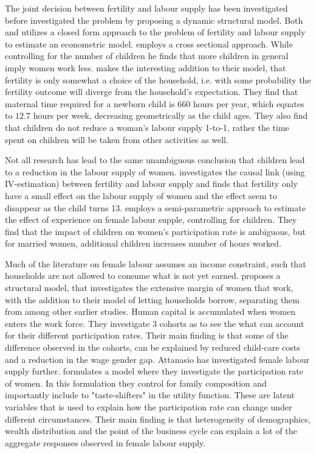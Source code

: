 The joint decision between fertility and labour supply has been investigated before \textcite{francesconi_joint_2002} investigated the problem by proposing a dynamic structural model. Both \textcite{moffitt_estimation_1984} and \textcite{hotz_empirical_1988} utilizes a closed form approach to the problem of fertility and labour supply to estimate an econometric model. \textcite{moffitt_estimation_1984} employs a cross sectional approach. While controlling for the  number of children he finds that more children in general imply women work less. \textcite{hotz_empirical_1988} makes the interesting addition to their model, that fertility is only somewhat a choice of the household, i.e. with some probability the fertility outcome will diverge from the household's expectation. They find that maternal time required for a newborn child is 660 hours per year, which equates to $12.7$ hours per week, decreasing geometrically as the child ages. They also find that children do not reduce a woman's labour supply 1-to-1, rather the time spent on children will be taken from other activities as well.

Not all research has lead to the same unambiguous conclusion that children lead to a reduction in the labour supply of women.   \textcite{angrist_children_1996}  investigates the causal link (using IV-estimation) between fertility and labour supply and finds that fertility only have a small effect on the labour supply of women and  the effect  seem to disappear as the child turns 13.  \textcite{altug_effect_1998} employs a semi-parametric approach to estimate the effect of experience on female labour supple, controlling for children. They find that the impact of children on women's participation rate is ambiguous, but for married women, additional children increases number of hours worked.

Much of the literature on female labour assumes an income constraint, such that households are not allowed to consume what is not yet earned.  \textcite{attanasio_explaining_2008} proposes a structural model, that investigates the extensive margin of women that work, with the addition to their model  of letting households borrow, separating them from \textcite{francesconi_joint_2002} among other earlier studies. Human capital is accumulated when women enters the work force. They investigate 3 cohorts as to see the what can account for their different participation rates. Their main finding is that some of the difference observed in the cohorts, can be explained by reduced child-care costs and a reduction in the wage gender gap. Attanasio has investigated female labour supply further.  \textcite{attanasio_aggregating_2018} formulates a model where they investigate the participation rate of women. In this formulation they control for family composition and importantly include to "taste-shifters" in the utility function. These are latent variables that is used to explain how the participation rate can change under different circumstances. Their main finding is that heterogeneity of demographics, wealth distribution and the point of the business cycle can explain a lot of the aggregate responses observed in female labour supply.


